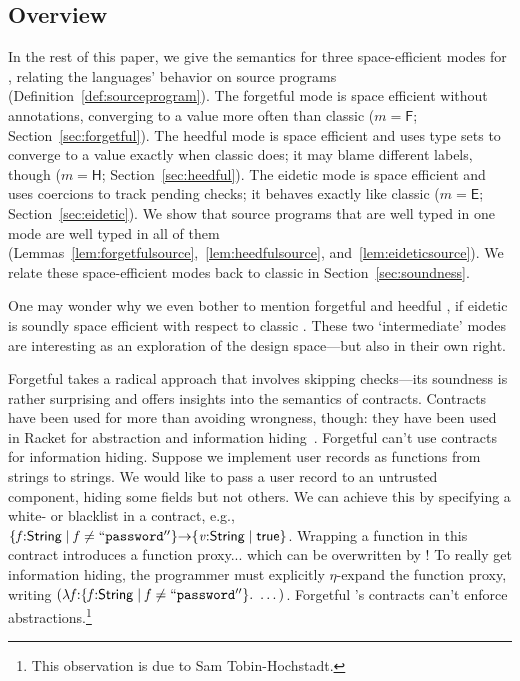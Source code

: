 \documentclass[9pt]{extarticle}
\newcommand{\ottnt}[1]{\mathit{#1}}
\newcommand{\ottsym}[1]{#1}
\begin{document}
{\iffull
\subsection{Overview}
\label{sec:overview}

In the rest of this paper, we give the semantics for three
space-efficient modes for \lambdah, relating the languages' behavior
on source programs (Definition~\ref{def:sourceprogram}).  The
forgetful mode is space efficient without annotations, converging to a
value more often than classic \lambdah ($\ottnt{m}  \ottsym{=}   \mathsf{F} $;
Section~\ref{sec:forgetful}).
The heedful mode is space efficient and uses type sets to converge to
a value exactly when classic \lambdah does; it may blame different
labels, though ($\ottnt{m}  \ottsym{=}   \mathsf{H} $; Section~\ref{sec:heedful}).
The eidetic mode is space efficient and uses coercions to track
pending checks; it behaves exactly like classic \lambdah ($\ottnt{m}  \ottsym{=}   \mathsf{E} $;
Section~\ref{sec:eidetic}).
We show that source programs that are well typed in one mode are well
typed in all of them
(Lemmas~\ref{lem:forgetfulsource},~\ref{lem:heedfulsource},
and~\ref{lem:eideticsource}).
We relate these space-efficient modes back to classic \lambdah in
Section~\ref{sec:soundness}.

One may wonder why we even bother to mention forgetful and heedful
\lambdah, if eidetic \lambdah is soundly space efficient with respect
to classic \lambdah.
These two `intermediate' modes are interesting as an exploration of
the design space---but also in their own right.

Forgetful \lambdah takes a radical approach that involves
skipping checks---its soundness is rather surprising and offers
insights into the semantics of contracts.
Contracts have been used for more than avoiding wrongness, though:
they have been used in Racket for abstraction and information
hiding~\cite{Racket,RacketContracts}.
Forgetful \lambdah can't use contracts for information hiding. Suppose
we implement user records as functions from strings to strings. We
would like to pass a user record to an untrusted component, hiding
some fields but not others.
We can achieve this by specifying a white- or blacklist in a contract,
e.g., $  \{ \mathit{f} \mathord{:}  \mathsf{String}  \mathrel{\mid}  \mathit{f}  \mathrel{\ne}   \mathtt{``password''}   \}  \mathord{ \rightarrow }  \{ \mathit{v} \mathord{:}  \mathsf{String}  \mathrel{\mid}  \mathsf{true}  \}  $. Wrapping a
function in this contract introduces a function proxy... which can be
overwritten by \ECastMerge! To really get information hiding, the
programmer must explicitly $\eta$-expand the function proxy, writing
$ (  \lambda \mathit{f} \mathord{:}  \{ \mathit{f} \mathord{:}  \mathsf{String}  \mathrel{\mid}  \mathit{f}  \mathrel{\ne}   \mathtt{``password''}   \}  .~  \dots  ) $. Forgetful \lambdah's
contracts can't enforce abstractions.\footnote{This
  observation is due to Sam Tobin-Hochstadt.}

}
\end{document}

